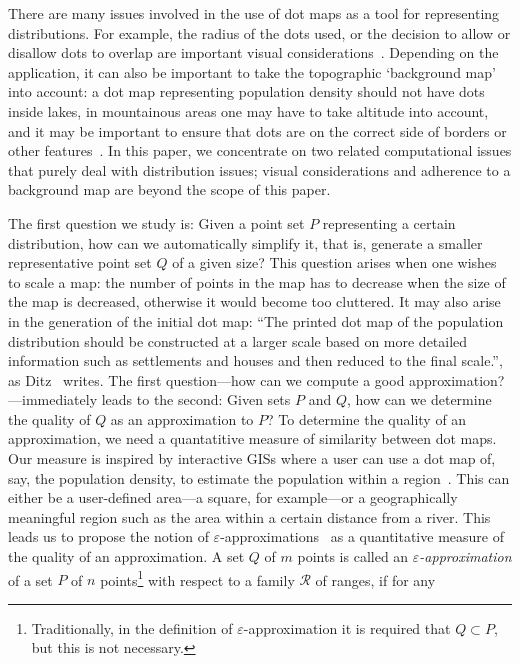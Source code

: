 \documentclass{elsart}
\newcommand{\eps}{\varepsilon}               %
\newcommand{\ranges}{{\mathcal R}}
\begin{document}
There are many issues involved in the use of dot maps as a tool for
representing distributions. For example, the radius of the dots used, or
the decision to allow or disallow dots to overlap are important visual
considerations~\cite{d-ctmd-99}. Depending on the application, it can
also be important to take the topographic `background map' into account:
a dot map representing population density should not have dots
inside lakes, in mountainous areas one may have to take altitude into
account, and it may be important to ensure that dots are
on the correct side of borders or other features~\cite{ditz}.
In this paper, we concentrate on two related computational issues
that purely deal with distribution issues; visual considerations
and adherence to a background map are beyond the scope of this paper.

The first question we study is: Given a point
set $P$ representing a certain distribution, how can we automatically
simplify it, that is, generate a smaller representative point set $Q$
of a given size?  This question arises when one wishes to scale a map:
the number of points in the map has to decrease when the size of the map
is decreased, otherwise it would become too cluttered. It may also arise
in the generation of the initial dot map: ``The printed dot map
of the population distribution should be constructed at a larger scale
based on more detailed information such as settlements and houses
and then reduced to the final scale.'', as Ditz~\cite{ditz} writes.
The first question---how can we compute a
good approximation?---immediately leads to the second: Given sets $P$
and $Q$, how can we determine the quality of $Q$ as an approximation
to $P$?
To determine the quality of an approximation, we need a
quantatitive measure of similarity between dot maps.
Our measure is inspired by interactive GISs
where a user can use a dot map of, say, the population
density, to estimate the population within a region~\cite{ditz}.
This can either be a user-defined area---a square, for example---or a
geographically meaningful region such as the area within a certain
distance from a river. This leads us to propose the notion of
$\eps$-approximations~\cite{vc71} as a quantitative measure
of the quality of an approximation.
A set $Q$ of $m$ points is called an \emph{$\eps$-approximation} of
a set $P$ of $n$ points\footnote{Traditionally, in the definition of
$\eps$-approximation it is required that $Q\subset P$, but this is not
necessary.} with respect to a family $\ranges$ of ranges, if for any
\end{document}
